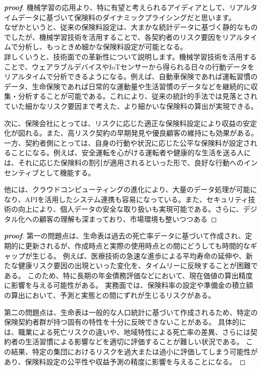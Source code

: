 \documentclass[a4paper,11pt]{jsarticle}
\begin{document}
\begin{proof}[\textbf{proof}]
  機械学習の応用より、特に有望と考えられるアイディアとして、リアルタイムデータに基づいて保険料のダイナミックプライシングだと思います。\\
  なぜかというと、従来の保険料設定は、大まかな統計データに基づく静的なものでしたが、機械学習技術を活用することで、各契約者のリスク要因をリアルタイムで分析し、もっときめ細かな保険料設定が可能となる。\\
  詳しくいうと、技術面での革新性について説明します。機械学習技術を活用することで、ウェアラブルデバイスやIoTセンサーから得られる日々の行動データをリアルタイムで分析できるようになる。例えば、自動車保険であれば運転習慣のデータ、生命保険であれば日常的な運動量や生活習慣のデータなどを継続的に収集・分析することが可能である。これにより、従来の統計的手法では見落とされていた細かなリスク要因まで考えた、より細かいな保険料の算出が実現できる。

  次に、保険会社にとっては、リスクに応じた適正な保険料設定により収益の安定化が図れる。また、高リスク契約の早期発見や優良顧客の維持にも効果がある。一方、契約者側にとっては、自身の行動や状況に応じた公平な保険料が設定されることになる。例えば、安全運転を心がける運転者や健康的な生活を送る人には、それに応じた保険料の割引が適用されるといった形で、良好な行動へのインセンティブとして機能する。

  他には、クラウドコンピューティングの進化により、大量のデータ処理が可能になり、APIを活用したシステム連携も容易になっている。また、セキュリティ技術の向上により、個人データの安全な取り扱いも実現可能である。さらに、デジタル化への顧客の理解も深まっており、市場環境も整いつつある
\end{proof}

\begin{proof}[\textbf{proof}]
第一の問題点は、生命表は過去の死亡率データに基づいて作成され、定期的に更新されるが、作成時点と実際の使用時点との間にどうしても時間的なギャップが生じる。
例えば、医療技術の急速な進歩による平均寿命の延伸や、新たな健康リスク要因の出現といった変化を、タイムリーに反映することが困難である。
このため、特に長期の年金債務評価などにおいて、現在価値の算出精度に影響を与える可能性がある。
実務面では、保険料率の設定や準備金の積立額の算出において、予測と実態との間にずれが生じるリスクがある。


第二の問題点は、生命表は一般的な人口統計に基づいて作成されるため、特定の保険契約者群が持つ固有の特性を十分に反映できないことがある。
具体的には、職業による死亡リスクの違いや、地域特性による死亡率の差異、さらには契約者の生活習慣による影響などを適切に評価することが難しい状況である。
この結果、特定の集団におけるリスクを過大または過小に評価してしまう可能性があり、保険料設定の公平性や収益予測の精度に影響を与えることになる。
  
\end{proof}
\end{document}
